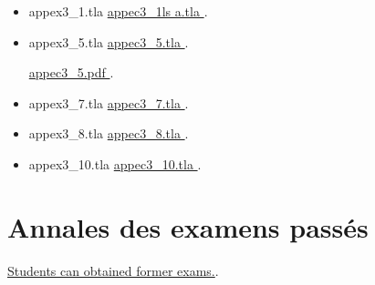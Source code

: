\documentclass[ 12pt]{article}
\begin{document}
\begin{tcolorbox}
\begin{itemize}

  \item[]   appex3\_1.tla 
    \href{http://mery54.github.io/teaching/mvsi/models/appex3_1.tla}{
      appec3\_1ls a.tla }.

    
  \item[]   appex3\_5.tla 
    \href{http://mery54.github.io/teaching/mvsi/models/appex3_5.tla}{
      appec3\_5.tla }.

       \href{http://mery54.github.io/teaching/mvsi/models/appex3_5.pdf}{
      appec3\_5.pdf }.

      \item[]   appex3\_7.tla 
        \href{http://mery54.github.io/teaching/mvsi/models/appex3_7.tla}{
          appec3\_7.tla }.

              \item[]   appex3\_8.tla 
        \href{http://mery54.github.io/teaching/mvsi/models/appex3_8.tla}{
          appec3\_8.tla }.

              \item[]   appex3\_10.tla 
        \href{http://mery54.github.io/teaching/mvsi/models/appex3_10.tla}{
          appec3\_10.tla }.
        
   \end{itemize}


\section{Annales   des examens passés}

\href{http://mery54.github.io/teaching/mvsi/lecturesnotes/mvsi-annales.pdf}{Students
  can obtained former  exams.}.
        
   



\end{tcolorbox}
\end{document}
